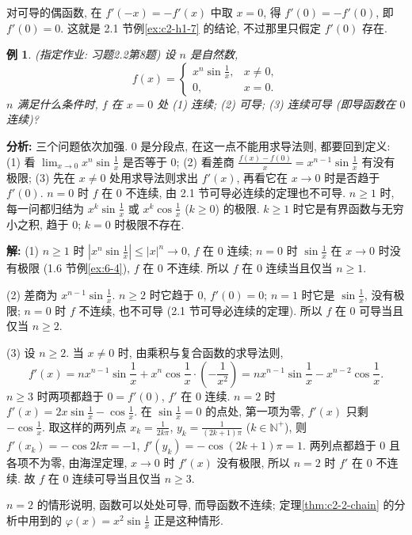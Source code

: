\documentclass[UTF8,openany]{ctexbook}
\theoremstyle{chinesetextbook}
\newtheorem{example}{例}[section]
\newenvironment{cnsolution}{\par\indent\textbf{解:} \ignorespaces}{\par}
\begin{document}
对可导的偶函数, 在 $f'(-x)=-f'(x)$ 中取 $x=0$, 得 $f'(0)=-f'(0)$, 即 $f'(0)=0$. 这就是 2.1 节例\ref{ex:c2-h1-7} 的结论, 不过那里只假定 $f'(0)$ 存在.
\begin{example}\label{ex:c2-h2-8}
\textnormal{(指定作业: 习题2.2第8题)} 设 $n$ 是自然数,
\[
f(x)=\begin{cases}x^n\sin\frac1x,&x\ne0,\\0,&x=0.\end{cases}
\]
$n$ 满足什么条件时, $f$ 在 $x=0$ 处 (1) 连续; (2) 可导; (3) 连续可导 (即导函数在 $0$ 连续)?
\end{example}
\par\indent\textbf{分析:} 三个问题依次加强. $0$ 是分段点, 在这一点不能用求导法则, 都要回到定义: (1) 看 $\displaystyle\lim_{x\to0}x^n\sin\frac1x$ 是否等于 $0$; (2) 看差商 $\displaystyle\frac{f(x)-f(0)}x=x^{n-1}\sin\frac1x$ 有没有极限; (3) 先在 $x\ne0$ 处用求导法则求出 $f'(x)$, 再看它在 $x\to0$ 时是否趋于 $f'(0)$. $n=0$ 时 $f$ 在 $0$ 不连续, 由 2.1 节可导必连续的定理也不可导. $n\ge1$ 时, 每一问都归结为 $\displaystyle x^k\sin\frac1x$ 或 $\displaystyle x^k\cos\frac1x$ ($k\ge0$) 的极限. $k\ge1$ 时它是有界函数与无穷小之积, 趋于 $0$; $k=0$ 时极限不存在.
\begin{cnsolution}
(1) $n\ge1$ 时 $\displaystyle\left|x^n\sin\frac1x\right|\le|x|^n\to0$, $f$ 在 $0$ 连续; $n=0$ 时 $\displaystyle\sin\frac1x$ 在 $x\to0$ 时没有极限 (1.6 节例\ref{ex:6-4}), $f$ 在 $0$ 不连续. 所以 $f$ 在 $0$ 连续当且仅当 $n\ge1$.

(2) 差商为 $\displaystyle x^{n-1}\sin\frac1x$. $n\ge2$ 时它趋于 $0$, $f'(0)=0$; $n=1$ 时它是 $\displaystyle\sin\frac1x$, 没有极限; $n=0$ 时 $f$ 不连续, 也不可导 (2.1 节可导必连续的定理). 所以 $f$ 在 $0$ 可导当且仅当 $n\ge2$.

(3) 设 $n\ge2$. 当 $x\ne0$ 时, 由乘积与复合函数的求导法则,
\[
f'(x)=nx^{n-1}\sin\frac1x+x^n\cos\frac1x\cdot\left(-\frac1{x^2}\right)=nx^{n-1}\sin\frac1x-x^{n-2}\cos\frac1x.
\]
$n\ge3$ 时两项都趋于 $0=f'(0)$, $f'$ 在 $0$ 连续. $n=2$ 时 $\displaystyle f'(x)=2x\sin\frac1x-\cos\frac1x$. 在 $\displaystyle\sin\frac1x=0$ 的点处, 第一项为零, $f'(x)$ 只剩 $\displaystyle-\cos\frac1x$. 取这样的两列点 $\displaystyle x_k=\frac1{2k\pi}$, $\displaystyle y_k=\frac1{(2k+1)\pi}$ ($k\in\mathbb N^+$), 则 $f'(x_k)=-\cos2k\pi=-1$, $f'(y_k)=-\cos(2k+1)\pi=1$. 两列点都趋于 $0$ 且各项不为零, 由海涅定理, $x\to0$ 时 $f'(x)$ 没有极限, 所以 $n=2$ 时 $f'$ 在 $0$ 不连续. 故 $f$ 在 $0$ 连续可导当且仅当 $n\ge3$.
\end{cnsolution}
$n=2$ 的情形说明, 函数可以处处可导, 而导函数不连续; 定理\ref{thm:c2-2-chain} 的分析中用到的 $\displaystyle\varphi(x)=x^2\sin\frac1x$ 正是这种情形.
\end{document}
